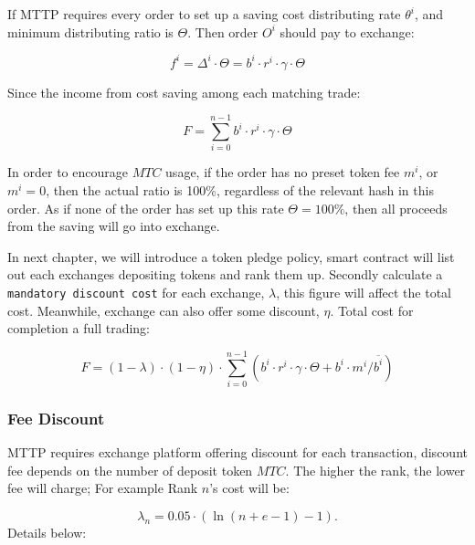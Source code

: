 \documentclass[UTF8,nofonts]{article}
\begin{document}
If MTTP requires every order to set up a saving cost distributing rate $\theta^i$, and minimum distributing ratio is $\Theta$. Then order $O^i$ should pay to exchange: 


\begin{equation*}
f^i = \Delta^i \cdot \Theta = b^i \cdot r^i \cdot \gamma \cdot \Theta
\end{equation*}

Since the income from cost saving among each matching trade:

\begin{equation*}
F = \sum^{n-1}_{i=0} b^i \cdot r^i \cdot \gamma \cdot \Theta
\end{equation*}

In order to encourage $MTC$ usage,  if the order has no preset token fee $m^i$, or $m^i=0$, then the actual ratio is 100\%,  regardless of the relevant hash in this order. As if none of the order has set up this rate $\Theta=100\%$,  then all proceeds from the saving will go into exchange.

In next chapter,  we will introduce a token pledge policy,  smart contract will list out each exchanges depositing tokens and rank them up. Secondly calculate a \texttt{mandatory discount cost} for each exchange, $\lambda$, this figure will affect the total cost. Meanwhile, exchange can also offer some discount, $\eta$. Total cost for completion a full trading: 

\begin{equation*}
F =(1-\lambda)\cdot (1-\eta) \cdot \sum^{n-1}_{i=0} (b^i \cdot r^i \cdot \gamma \cdot \Theta + b^i \cdot m^i / \overline{b^i})
\end{equation*}


\subsubsection{Fee Discount}
MTTP requires exchange platform offering discount for each transaction,  discount fee depends on the number of deposit token $MTC$. The higher the rank,  the lower fee will charge; For example Rank $n$'s cost will be:

$$\lambda_{n} = 0.05\cdot(\ln (n+e-1) - 1)\text{.}$$
Details below:
\end{document}
